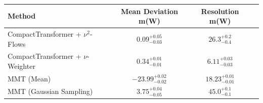     \begin{tabular}{lccc}
        \toprule
        Method & Mean Deviation m(W) & Resolution m(W) \\
        \midrule
        CompactTransformer + $\nu^2$-Flows & $0.09_{-0.03}^{+0.05}$ & $26.3_{-0.4}^{+0.2}$ \\
        CompactTransformer + $\nu$-Weighter & $0.34_{-0.01}^{+0.01}$ & $6.11_{-0.03}^{+0.03}$ \\
        MMT (Mean) & $-23.99_{-0.02}^{+0.02}$ & $18.23_{-0.01}^{+0.01}$ \\
        MMT (Gaussian Sampling) & $3.75_{-0.05}^{+0.04}$ & $45.0_{-0.1}^{+0.1}$ \\
        \bottomrule
    \end{tabular}